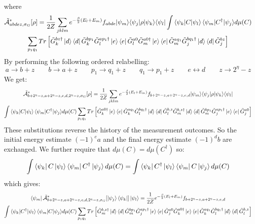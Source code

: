 \documentclass[aps,floatfix,10pt,amssymb,amsfont,amsmath,superscriptaddress,float,nofootinbib,longbibliography,nobalancelastpage,twocolumn]{revtex4-2}
\begin{document}
where 
\begin{multline}
  \tilde{\mathcal{A}}^*_{abdez,\sigma_G}[\rho] = \frac{1}{2Z} \sum_{jklm}  e^{-\frac{\beta}{2}(E_l+E_m)}{f_{abde}} {\ket{\psi_m}}{\bra{\psi_j}}\rho{\ket{\psi_k}}{\bra{\psi_l}} \int {\braket{\psi_k|C|\psi_l}\braket{\psi_m|C^{\dagger}|\psi_j}} d\mu(C)\\\sum_{p_1q_1}Tr\left[ {\tilde G^{bz\dagger}_k\ket{d}\bra{d}\tilde G^{bp_1}_k} {\tilde G_l^{ap_1\dagger}\ket{e}\bra{e}\tilde G_l^{a0}\tilde G_m^{a0\dagger}\ket{e}\bra{e}\tilde G_m^{aq_1}} {\tilde G^{bq_1\dagger}_j\ket{d}\bra{d}\tilde G^{bz}_j } \right]
\end{multline}
By performing the following ordered relabelling:
\begin{equation}
    a \rightarrow b+z \qquad b\rightarrow a+z \qquad p_1 \rightarrow q_1+ z \qquad q_1 \rightarrow p_1 + z \qquad e \leftrightarrow d \qquad z \rightarrow 2^{\eta}-z
\end{equation}
We get:
\begin{multline}
  \tilde{\mathcal{A}}^*_{b+2^{\eta}-z,a+2^{\eta}-z,e,d,2^{\eta}-z,\sigma_G}[\rho] = \frac{1}{2Z} \sum_{jklm}  e^{-\frac{\beta}{2}(E_l+E_m)}{f_{b+2^{\eta}-z,a+2^{\eta}-z,e,d}} {\ket{\psi_m}}{\bra{\psi_j}}\rho{\ket{\psi_k}}{\bra{\psi_l}} \\\int {\braket{\psi_k|C|\psi_l}\braket{\psi_m|C^{\dagger}|\psi_j}} d\mu(C)\sum_{p_1q_1} Tr\left[{\tilde G^{a0\dagger}_k\ket{e}\bra{e}\tilde G^{aq_1}_k} {\tilde G_l^{bq_1\dagger}\ket{d}\bra{d}\tilde G_l^{b,z}\tilde G_m^{b, z\dagger}\ket{d}\bra{d}\tilde G_m^{bp_1}} {\tilde G^{ap_1\dagger}_j\ket{e}\bra{e}\tilde G^{a0}_j } \right]
\end{multline}
These substitutions reverse the history of the measurement outcomes. So the initial energy estimate $(-1)^ea$ and the final energy estimate $(-1)^db$ are exchanged. We further require that $d\mu(C) = d\mu(C^{\dagger})$ so:
\begin{equation}
    \int  \bra{\psi_k}C\ket{\psi_{l}}\bra{\psi_m}C^{\dagger} \ket{\psi_j} d\mu(C) = \int  \bra{\psi_k}C^{\dagger}\ket{\psi_{l}}\bra{\psi_m}C \ket{\psi_j} d\mu(C)
\end{equation}
which gives:
\begin{multline}
 \bra{\psi_m}\tilde{\mathcal{A}}^*_{b+2^{\eta}-z,a+2^{\eta}-z,e,d,2^{\eta}-z,\sigma_G}[\ket{\psi_j}\bra{\psi_k}]\ket{\psi_l}  = \frac{1}{2Z} e^{-\frac{\beta}{2}(E_l+E_m)}{f_{b+2^{\eta}-z,a+2^{\eta}-z,e,d}} \\\int {\braket{\psi_k|C^{\dagger}|\psi_l}\braket{\psi_m|C|\psi_j}} d\mu(C)\sum_{p_1q_1} Tr\left[ {\tilde G_m^{b, z\dagger}\ket{d}\bra{d}\tilde G_m^{bp_1}} {\tilde G^{ap_1\dagger}_j\ket{e}\bra{e}\tilde G^{a0}_j } \tilde G^{a0\dagger}_k\ket{e}\bra{e}\tilde G^{aq_1}_k \tilde G_l^{bq_1\dagger}\ket{d}\bra{d}\tilde G_l^{b,z}\right]
\end{multline}
\end{document}
